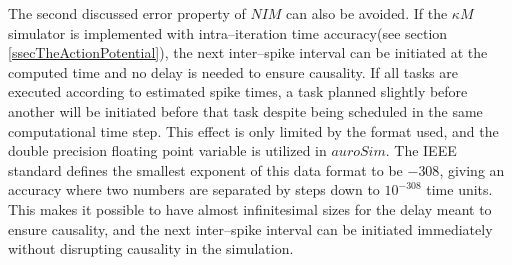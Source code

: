 		The second discussed error property of $NIM$ can also be avoided.
		If the $\kappa M$ simulator is implemented with intra--iteration time accuracy(see section \ref{ssecTheActionPotential}), 
			the next inter--spike interval can be initiated at the computed time and no delay is needed to ensure causality.
		If all tasks are executed according to estimated spike times, a task planned slightly before another will be initiated before that task despite being scheduled in the same computational time step.
		This effect is only limited by the format used, and the double precision floating point variable is utilized in $auroSim$.
		The IEEE standard defines the smallest exponent of this data format to be $-308$, giving an accuracy where two numbers are separated by steps down to $10^{-308}$ time units\cite{kreyszig8edKAP17}.
		This makes it possible to have almost infinitesimal sizes for the delay meant to ensure causality, 
			and the next inter--spike interval can be initiated immediately without disrupting causality in the simulation.

